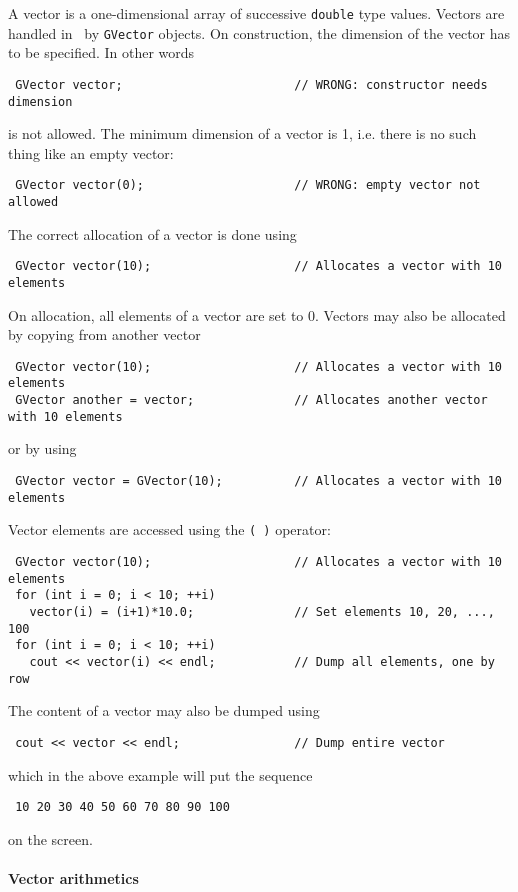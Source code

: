 \documentclass{article}[12pt,a4]
\begin{document}
A vector is a one-dimensional array of successive {\tt double} type values.
Vectors are handled in \this\ by {\tt GVector} objects.
On construction, the dimension of the vector has to be specified.
In other words
\begin{verbatim}
 GVector vector;                        // WRONG: constructor needs dimension
\end{verbatim}
is not allowed.
The minimum dimension of a vector is 1, i.e. there is no such thing 
like an empty vector:
\begin{verbatim}
 GVector vector(0);                     // WRONG: empty vector not allowed
\end{verbatim}
The correct allocation of a vector is done using
\begin{verbatim}
 GVector vector(10);                    // Allocates a vector with 10 elements
\end{verbatim}
On allocation, all elements of a vector are set to 0.
Vectors may also be allocated by copying from another vector
\begin{verbatim}
 GVector vector(10);                    // Allocates a vector with 10 elements
 GVector another = vector;              // Allocates another vector with 10 elements
\end{verbatim}
or by using 
\begin{verbatim}
 GVector vector = GVector(10);          // Allocates a vector with 10 elements
\end{verbatim}

Vector elements are accessed using the {\tt ( )} operator:
\begin{verbatim}
 GVector vector(10);                    // Allocates a vector with 10 elements
 for (int i = 0; i < 10; ++i)
   vector(i) = (i+1)*10.0;              // Set elements 10, 20, ..., 100
 for (int i = 0; i < 10; ++i)
   cout << vector(i) << endl;           // Dump all elements, one by row 
\end{verbatim}
The content of a vector may also be dumped using
\begin{verbatim}
 cout << vector << endl;                // Dump entire vector
\end{verbatim}
which in the above example will put the sequence
\begin{verbatim}
 10 20 30 40 50 60 70 80 90 100
\end{verbatim}
on the screen.


\paragraph{Vector arithmetics}
\end{document}
